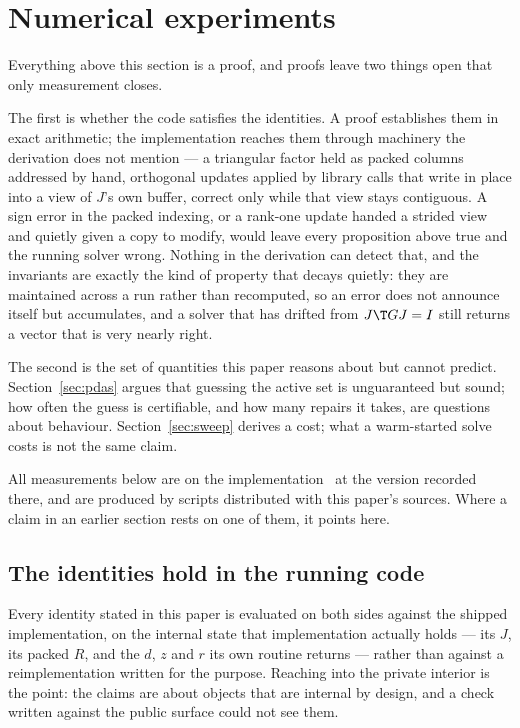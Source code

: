 \section{Numerical experiments}
\label{sec:experiments}

Everything above this section is a proof, and proofs leave two things open that
only measurement closes.

The first is whether the code satisfies the identities. A proof establishes them in
exact arithmetic; the implementation reaches them through machinery the derivation
does not mention --- a triangular factor held as packed columns addressed by hand,
orthogonal updates applied by library calls that write in place into a view of
$J$'s own buffer, correct only while that view stays contiguous. A sign error in
the packed indexing, or a rank-one update handed a strided view and quietly given a
copy to modify, would leave every proposition above true and the running solver
wrong. Nothing in the derivation can detect that, and the invariants are exactly
the kind of property that decays quietly: they are maintained across a run rather
than recomputed, so an error does not announce itself but accumulates, and a solver
that has drifted from $J\T G J = I$ still returns a vector that is very nearly
right.

The second is the set of quantities this paper reasons about but cannot predict.
Section~\ref{sec:pdas} argues that guessing the active set is unguaranteed but
sound; how often the guess is certifiable, and how many repairs it takes, are
questions about behaviour. Section~\ref{sec:sweep} derives a cost;
what a warm-started solve costs is not the same claim.

All measurements below are on the implementation~\cite{cvxquadprog} at the version
recorded there, and are produced by scripts distributed with this paper's sources.
Where a claim in an earlier section rests on one of them, it points here.

\subsection{The identities hold in the running code}
\label{ssec:identities}

Every identity stated in this paper is evaluated on both sides against the shipped
implementation, on the internal state that implementation actually holds --- its
$J$, its packed $R$, and the $d$, $z$ and $r$ its own routine returns --- rather
than against a reimplementation written for the purpose. Reaching into the private
interior is the point: the claims are about objects that are internal by design,
and a check written against the public surface could not see them.

